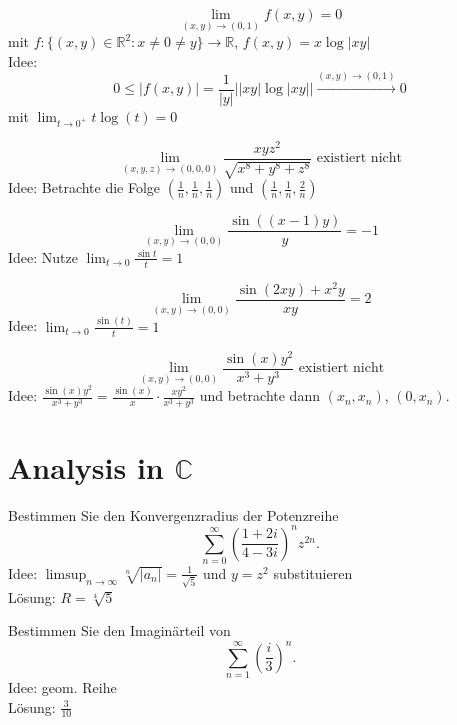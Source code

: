 \documentclass[parskip=full]{scrartcl}
\begin{document}
\begin{displaymath}
  \lim_{(x,y) \to (0,1)} f(x,y) = 0
\end{displaymath}
mit $f : \{(x,y) \in \mathbb{R}^2: x \neq 0 \neq y\} \to \mathbb{R}$, $f(x,y) = x \log |xy|$\\
Idee:
\begin{displaymath}
  0 \leq |f(x,y)| = \frac{1}{|y|} ||xy| \log |xy|| \xrightarrow{(x,y) \to (0,1)} 0
\end{displaymath}
mit $\lim_{t \to 0^+} t\log(t) = 0$

\begin{displaymath}
  \lim_{(x,y,z) \to (0,0,0)} \frac{xyz^2}{\sqrt{x^8 + y^8 + z^8}} \text{ existiert nicht}
\end{displaymath}
Idee: Betrachte die Folge $\left(\frac{1}{n}, \frac{1}{n}, \frac{1}{n}\right)$ und $\left(\frac{1}{n}, \frac{1}{n}, \frac{2}{n}\right)$

\begin{displaymath}
  \lim_{(x,y) \to (0,0)} \frac{\sin((x-1)y)}{y} = -1
\end{displaymath}
Idee: Nutze $\lim_{t \to 0} \frac{\sin t}{t} = 1$

\begin{displaymath}
  \lim_{(x,y) \to (0,0)} \frac{\sin(2xy) + x^2y}{xy} = 2
\end{displaymath}
Idee: $\lim_{t \to 0} \frac{\sin(t)}{t} = 1$

\begin{displaymath}
  \lim_{(x,y) \to (0,0)} \frac{\sin(x)y^2}{x^3 + y^3} \text{ existiert nicht}
\end{displaymath}
Idee: $\frac{\sin(x)y^2}{x^3 + y^3} = \frac{\sin(x)}{x} \cdot \frac{xy^2}{x^3 + y^3}$ und betrachte dann $(x_n, x_n)$, $(0, x_n)$.

\section{Analysis in $\mathbb{C}$}
Bestimmen Sie den Konvergenzradius der Potenzreihe
\begin{displaymath}
  \sum_{n = 0}^{\infty} \left(\frac{1+2i}{4-3i}\right)^n z^{2n}.
\end{displaymath}
Idee: $\limsup_{n \to \infty} \sqrt[n]{|a_n|} = \frac{1}{\sqrt{5}}$ und $y = z^2$ substituieren\\
Lösung: $R = \sqrt[4]{5}$

Bestimmen Sie den Imaginärteil von
\begin{displaymath}
  \sum_{n = 1}^{\infty} \left(\frac{i}{3}\right)^n.
\end{displaymath}
Idee: geom. Reihe\\
Lösung: $\frac{3}{10}$
\end{document}

